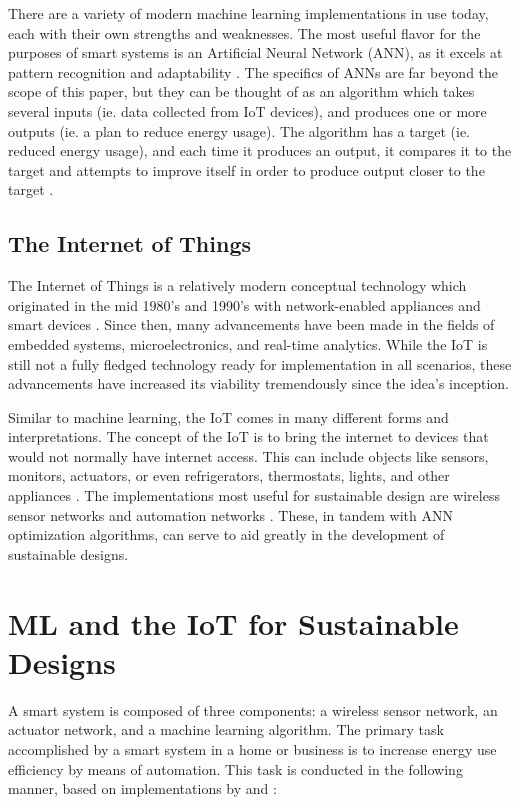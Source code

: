 \documentclass[letterpaper]{article}
\begin{document}
There are a variety of modern machine learning implementations in use today, each with their own strengths and weaknesses. The most useful flavor for the purposes of smart systems is an Artificial Neural Network (ANN), as it excels at pattern recognition and adaptability \cite[p.~227-230]{bishop06}. The specifics of ANNs are far beyond the scope of this paper, but they can be thought of as an algorithm which takes several inputs (ie. data collected from IoT devices), and produces one or more outputs (ie. a plan to reduce energy usage). The algorithm has a target (ie. reduced energy usage), and each time it produces an output, it compares it to the target and attempts to improve itself in order to produce output closer to the target \cite[ch.~1]{bonaccorso17}.

\subsection{The Internet of Things} \label{IoTinfo}
The Internet of Things is a relatively modern conceptual technology which originated in the mid 1980's and 1990's with network-enabled appliances and smart devices \cite{weiser91}. Since then, many advancements have been made in the fields of embedded systems, microelectronics, and real-time analytics. While the IoT is still not a fully fledged technology ready for implementation in all scenarios, these advancements have increased its viability tremendously since the idea's inception.\par

Similar to machine learning, the IoT comes in many different forms and interpretations. The concept of the IoT is to bring the internet to devices that would not normally have internet access. This can include objects like sensors, monitors, actuators, or even refrigerators, thermostats, lights, and other appliances \cite{wortmann15}. The implementations most useful for sustainable design are wireless sensor networks and automation networks \cite{atzori10}. These, in tandem with ANN optimization algorithms, can serve to aid greatly in the development of sustainable designs.

\section{ML and the IoT for Sustainable Designs} \label{main}
A smart system is composed of three components: a wireless sensor network, an actuator network, and a machine learning algorithm. The primary task accomplished by a smart system in a home or business is to increase energy use efficiency by means of automation. This task is conducted in the following manner, based on implementations by \textcite[p.~315-317]{pang15} and \textcite[p.~1458-1460]{risteska17}:
\end{document}
